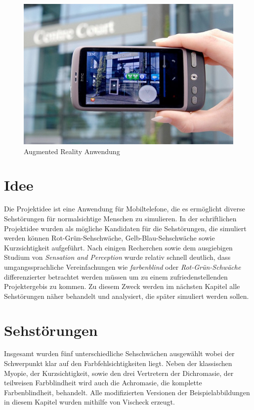 \documentclass[a4paper]{article}
\begin{document}
\begin{figure}[H]
\centering
\includegraphics[width=\textwidth, trim=0 50 0 60, clip=true]{augmented-reality.jpg}
\caption{Augmented Reality Anwendung}
\label{augmented-reality}
\end{figure}

\newpage

\section*{Idee}
Die Projektidee ist eine Anwendung für Mobiltelefone, die es ermöglicht diverse Sehstörungen für normalsichtige Menschen zu simulieren. In der schriftlichen Projektidee wurden als mögliche Kandidaten für die Sehstörungen, die simuliert werden können Rot-Grün-Sehschwäche, Gelb-Blau-Sehschwäche sowie Kurzsichtigkeit aufgeführt. Nach einigen Recherchen sowie dem ausgiebigen Studium von \textit{Sensation and Perception} \cite{Goldstein2009} wurde relativ schnell deutlich, dass umgangssprachliche Vereinfachungen wie \textit{farbenblind} oder \textit{Rot-Grün-Schwäche} differenzierter betrachtet werden müssen um zu einem zufriedenstellenden Projektergebis zu kommen. Zu diesem Zweck werden im nächsten Kapitel alle Sehstörungen näher behandelt und analysiert, die später simuliert werden sollen.

\section*{Sehstörungen}
Insgesamt wurden fünf unterschiedliche Sehschwächen ausgewählt wobei der Schwerpunkt klar auf den Farbfehlsichtigkeiten liegt. Neben der klassischen Myopie, der Kurzsichtigkeit, sowie den drei Vertretern der Dichromasie, der teilweisen Farbblindheit \cite{WP-D} wird auch die Achromasie, die komplette Farbenblindheit, behandelt. Alle modifizierten Versionen der Beispielabbildungen in diesem Kapitel wurden mithilfe von Vischeck \cite{VISCHECK} erzeugt.
\end{document}

